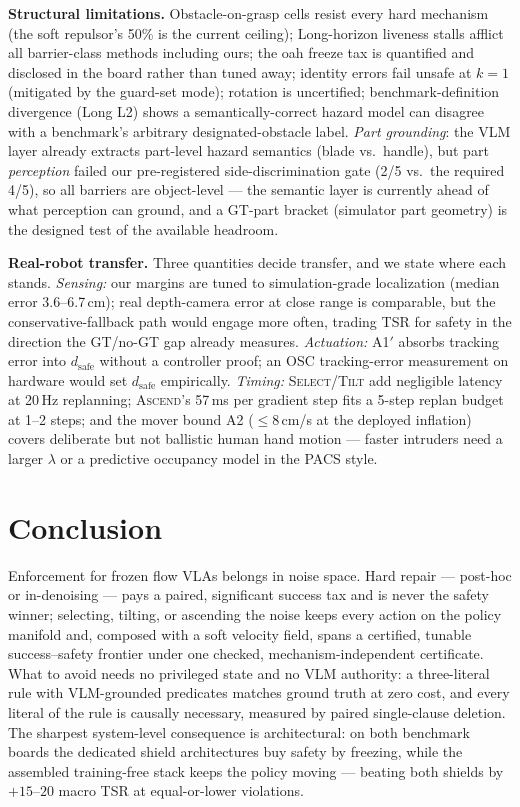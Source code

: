 \documentclass[conference]{IEEEtran}
\begin{document}
\textbf{Structural limitations.} Obstacle-on-grasp cells resist every hard mechanism (the soft repulsor's 50\% is the current ceiling); Long-horizon liveness stalls afflict all barrier-class methods including ours; the oah freeze tax is quantified and disclosed in the board rather than tuned away; identity errors fail unsafe at $k{=}1$ (mitigated by the guard-set mode); rotation is uncertified; benchmark-definition divergence (Long L2) shows a semantically-correct hazard model can disagree with a benchmark's arbitrary designated-obstacle label. \emph{Part grounding}: the VLM layer already extracts part-level hazard semantics (blade vs.\ handle), but part \emph{perception} failed our pre-registered side-discrimination gate (2/5 vs.\ the required 4/5), so all barriers are object-level --- the semantic layer is currently ahead of what perception can ground, and a GT-part bracket (simulator part geometry) is the designed test of the available headroom.

\textbf{Real-robot transfer.} Three quantities decide transfer, and we state where each stands. \emph{Sensing:} our margins are tuned to simulation-grade localization (median error 3.6--6.7\,cm); real depth-camera error at close range is comparable, but the conservative-fallback path would engage more often, trading TSR for safety in the direction the GT/no-GT gap already measures. \emph{Actuation:} A1$'$ absorbs tracking error into $d_{\mathrm{safe}}$ without a controller proof; an OSC tracking-error measurement on hardware would set $d_{\mathrm{safe}}$ empirically. \emph{Timing:} \textsc{Select}/\textsc{Tilt} add negligible latency at 20\,Hz replanning; \textsc{Ascend}'s 57\,ms per gradient step fits a 5-step replan budget at 1--2 steps; and the mover bound A2 ($\le$8\,cm/s at the deployed inflation) covers deliberate but not ballistic human hand motion --- faster intruders need a larger $\lambda$ or a predictive occupancy model in the PACS \cite{pacs} style.

\section{Conclusion}
Enforcement for frozen flow VLAs belongs in noise space. Hard repair --- post-hoc or in-denoising --- pays a paired, significant success tax and is never the safety winner; selecting, tilting, or ascending the noise keeps every action on the policy manifold and, composed with a soft velocity field, spans a certified, tunable success--safety frontier under one checked, mechanism-independent certificate. What to avoid needs no privileged state and no VLM authority: a three-literal rule with VLM-grounded predicates matches ground truth at zero cost, and every literal of the rule is causally necessary, measured by paired single-clause deletion. The sharpest system-level consequence is architectural: on both benchmark boards the dedicated shield architectures buy safety by freezing, while the assembled training-free stack keeps the policy moving --- beating both shields by $+15$--$20$ macro TSR at equal-or-lower violations.
\end{document}
